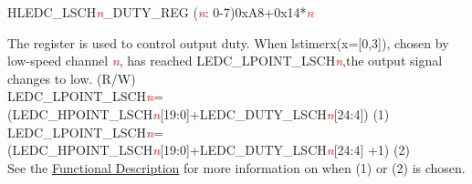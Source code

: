 \begin{register}{H}{LEDC\_LSCH\textcolor{red}{\it{n}}\_DUTY\_REG (\textcolor{red}{\it{n}}: 0-7)}{0xA8+0x14*\textcolor{red}{\it{n}}}\label{regdesc:LEDCLSCHnDUTYREG}
%
%
\regnewline%
\begin{regdesc}\begin{reglist}
\item [LEDC\_DUTY\_LSCH\textcolor{red}{\it{n}}]The register is used to control output duty. When lstimerx(x=[0,3]), chosen by low-speed channel \textcolor{red}{\it{n}}, has reached LEDC\_LPOINT\_LSCH\textcolor{red}{\it{n}},the output signal changes to low. (R/W) \\ LEDC\_LPOINT\_LSCH\textcolor{red}{\it{n}}=(LEDC\_HPOINT\_LSCH\textcolor{red}{\it{n}}[19:0]+LEDC\_DUTY\_LSCH\textcolor{red}{\it{n}}[24:4]) (1) \\LEDC\_LPOINT\_LSCH\textcolor{red}{\it{n}}=(LEDC\_HPOINT\_LSCH\textcolor{red}{\it{n}}[19:0]+LEDC\_DUTY\_LSCH\textcolor{red}{\it{n}}[24:4] +1) (2) \\    See the \hyperref[ledcfd:dithering]{Functional Description} for more information on when (1) or (2) is chosen.
\end{reglist}\end{regdesc}
\end{register}


